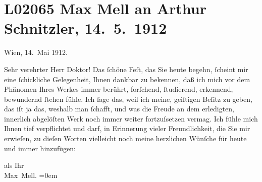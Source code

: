 

\section[Max Mell an Arthur Schnitzler, 14. 5. 1912]{L02065 Max Mell an Arthur Schnitzler, 14. 5. 1912}
\nopagebreak{}
\rehead{ }\normalsize\beginnumbering{}
\toendnotes[C]{\smallbreak\pagebreak[2]}
\pstart
           \raggedleft{}{\pb}Wien, 14. Mai 1912.\pend
           
\pstart{}Sehr verehrter Herr Doktor!\pend\vspace{0.5em}
\pstart
           Das ſchöne Feſt, das Sie heute begehn, ſcheint mir eine ſchickliche Gelegenheit,
               Ihnen dankbar zu bekennen, daß ich mich vor dem Phänomen Ihres Werkes immer berührt,
               forſchend, ſtudierend, erkennend, bewundernd ſtehen fühle. Ich ſage das, weil ich
               meine, geiſtigen Beſitz zu geben, das iſt ja das, weshalb man ſchafft, und was die
               Freude an dem erledigten, innerlich abgelöſten Werk noch immer weiter fortzuſsetzen
               vermag. Ich fühle mich Ihnen tief verpflichtet und darf, in Erinnerung vieler
               Freundlichkeit, die Sie mir erwieſen, zu dieſen Worten vielleicht noch meine
               herzlichen Wünſche für heute und immer hinzufügen:\pend
           
\pstart
           als Ihr{\\[\baselineskip]}\spacefill\mbox{Max Mell.}\pend
           \leftskip=0em{}\endnumbering{}  
      